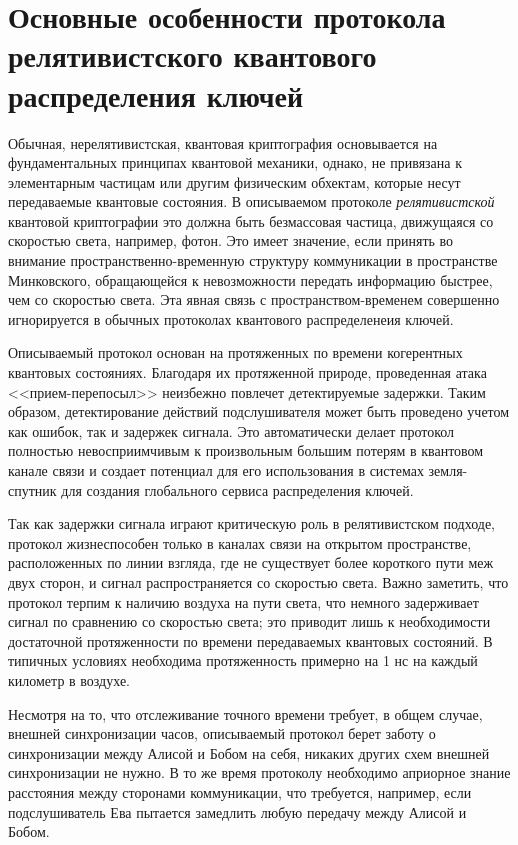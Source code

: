 \section[Основные особенности протокола]{Основные особенности протокола релятивистского квантового распределения ключей}
Обычная, нерелятивистская, квантовая криптография основывается на фундаментальных принципах квантовой механики, однако, не привязана к элементарным частицам или другим физическим обхектам, которые несут передаваемые квантовые состояния. В описываемом протоколе \textit{релятивистской} квантовой криптографии это должна быть безмассовая частица, движущаяся со скоростью света, например, фотон. 
Это имеет значение, если принять во внимание пространственно-временную структуру коммуникации в пространстве Минковского, обращающейся к невозможности передать информацию быстрее, чем со скоростью света.
Эта явная связь с пространством-временем совершенно игнорируется в обычных протоколах квантового распределенеия ключей.

Описываемый протокол основан на протяженных по времени когерентных квантовых состояниях. Благодаря их протяженной природе, проведенная атака <<прием-перепосыл>> неизбежно повлечет детектируемые задержки.
Таким образом, детектирование действий подслушивателя может быть проведено учетом как ошибок, так и задержек сигнала. 
Это автоматически делает протокол полностью невосприимчивым к произвольным большим потерям в квантовом канале связи и создает потенциал для его использования в системах земля-спутник для создания глобального сервиса распределения ключей.

Так как задержки сигнала играют критическую роль в релятивистском подходе, протокол жизнеспособен только в каналах связи на открытом пространстве, расположенных по линии взгляда, где не существует более короткого пути меж двух сторон, и сигнал распространяется со скоростью света. 
Важно заметить, что протокол терпим к наличию воздуха на пути света, что немного задерживает сигнал по сравнению со скоростью света; это приводит лишь к необходимости достаточной протяженности по времени передаваемых квантовых состояний. 
В типичных условиях необходима протяженность примерно на 1 нс на каждый километр в воздухе.

Несмотря на то, что отслеживание точного времени требует, в общем случае, внешней синхронизации часов, описываемый протокол берет заботу о синхронизации между Алисой и Бобом на себя, никаких других схем внешней синхронизации не нужно. 
В то же время протоколу необходимо априорное знание расстояния между сторонами коммуникации, что требуется, например, если подслушиватель Ева пытается замедлить любую передачу между Алисой и Бобом.

